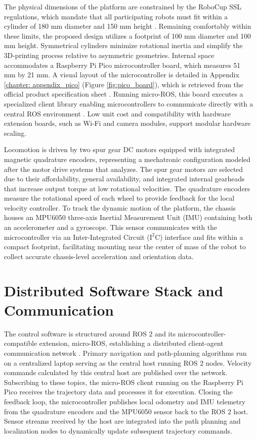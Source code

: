 \documentclass[a4paper,twoside,12pt]{report}
\begin{document}
The physical dimensions of the platform are constrained by the RoboCup SSL regulations, which mandate that all participating robots must fit within a cylinder of 180 mm diameter and 150 mm height \citep{ssl_rules_2026}. Remaining comfortably within these limits, the proposed design utilizes a footprint of 100 mm diameter and 100 mm height. Symmetrical cylinders minimize rotational inertia and simplify the 3D-printing process relative to asymmetric geometries. Internal space accommodates a Raspberry Pi Pico microcontroller board, which measures 51 mm by 21 mm. A visual layout of the microcontroller is detailed in Appendix \ref{chapter: appendix_pico} (Figure \ref{fig:pico_board}), which is retrieved from the official product specification sheet \citep{pico_datasheet}. Running micro-ROS, this board executes a specialized client library enabling microcontrollers to communicate directly with a central ROS environment \citep{macenski2022robot}. Low unit cost and compatibility with hardware extension boards, such as Wi-Fi and camera modules, support modular hardware scaling.

Locomotion is driven by two spur gear DC motors equipped with integrated magnetic quadrature encoders, representing a mechatronic configuration modeled after the motor drive systems that \citet{salem2013} analyzes. The spur gear motors are selected due to their affordability, general availability, and integrated internal gearheads that increase output torque at low rotational velocities. The quadrature encoders measure the rotational speed of each wheel to provide feedback for the local velocity controller. To track the dynamic motion of the platform, the chassis houses an MPU6050 three-axis Inertial Measurement Unit (IMU) containing both an accelerometer and a gyroscope. This sensor communicates with the microcontroller via an Inter-Integrated Circuit ($\text{I}^2\text{C}$) interface and fits within a compact footprint, facilitating mounting near the center of mass of the robot to collect accurate chassis-level acceleration and orientation data.

\section{Distributed Software Stack and Communication}

The control software is structured around ROS 2 and its microcontroller-compatible extension, micro-ROS, establishing a distributed client-agent communication network \citep{macenski2022robot}. Primary navigation and path-planning algorithms run on a centralized laptop serving as the central host running ROS 2 nodes. Velocity commands calculated by this central host are published over the network. Subscribing to these topics, the micro-ROS client running on the Raspberry Pi Pico receives the trajectory data and processes it for execution. Closing the feedback loop, the microcontroller publishes local odometry and IMU telemetry from the quadrature encoders and the MPU6050 sensor back to the ROS 2 host. Sensor streams received by the host are integrated into the path planning and localization nodes to dynamically update subsequent trajectory commands.
\end{document}
